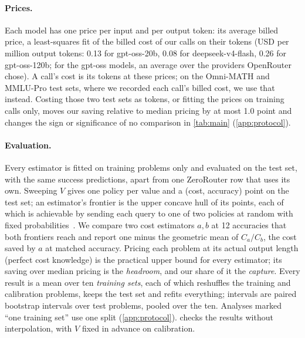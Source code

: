 \documentclass[10pt]{article}
\begin{document}
\paragraph{Prices.}
Each model has one price per input and per output token: its average billed price, a least-squares fit of the billed cost of our calls on their tokens (USD per million output tokens: 0.13 for gpt-oss-20b, 0.08 for deepseek-v4-flash, 0.26 for gpt-oss-120b; for the gpt-oss models, an average over the providers OpenRouter chose). A call's cost is its tokens at these prices; on the Omni-MATH and MMLU-Pro test sets, where we recorded each call's billed cost, we use that instead. Costing those two test sets as tokens, or fitting the prices on training calls only, moves our saving relative to median pricing by at most 1.0 point and changes the sign or significance of no comparison in \cref{tab:main} (\cref{app:protocol}).

\paragraph{Evaluation.}
Every estimator is fitted on training problems only and evaluated on the test set, with the same success predictions, apart from one ZeroRouter row that uses its own. Sweeping $V$ gives one policy per value and a (cost, accuracy) point on the test set; an estimator's frontier is the upper concave hull of its points, each of which is achievable by sending each query to one of two policies at random with fixed probabilities~\citep{routerbench}. We compare two cost estimators $a,b$ at 12 accuracies that both frontiers reach and report one minus the geometric mean of $C_a/C_b$, the cost saved by $a$ at matched accuracy. Pricing each problem at its actual output length (perfect cost knowledge) is the practical upper bound for every estimator; its saving over median pricing is the \emph{headroom}, and our share of it the \emph{capture}. Every result is a mean over ten \emph{training sets}, each of which reshuffles the training and calibration problems, keeps the test set and refits everything; intervals are paired bootstrap intervals over test problems, pooled over the ten. Analyses marked ``one training set'' use one split (\cref{app:protocol}).  checks the results without interpolation, with $V$ fixed in advance on calibration.
\end{document}
